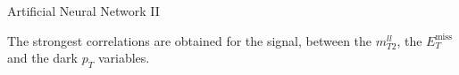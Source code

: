 \documentclass[8 pt]{beamer}
\begin{document}
\begin{frame}{Artificial Neural Network II}
  \hspace{4pt}
   \begin{minipage}[c]{.02\linewidth}
	\begin{exampleblock}{}  \end{exampleblock}
   \end{minipage}	
   \hspace{5pt}
   \begin{minipage}[c]{.30\linewidth}
   \end{minipage} \hfill
   \begin{minipage}[c]{.30\linewidth}
   \end{minipage} \hfill
   \begin{minipage}[c]{.30\linewidth}
   	\justifying
	The strongest correlations are obtained for the signal, between the $m_{T2}^{ll}$, the $E_T^{\text{miss}}$ and the dark $p_T$ variables.
   \end{minipage} \hfill

\end{frame}
\end{document}
